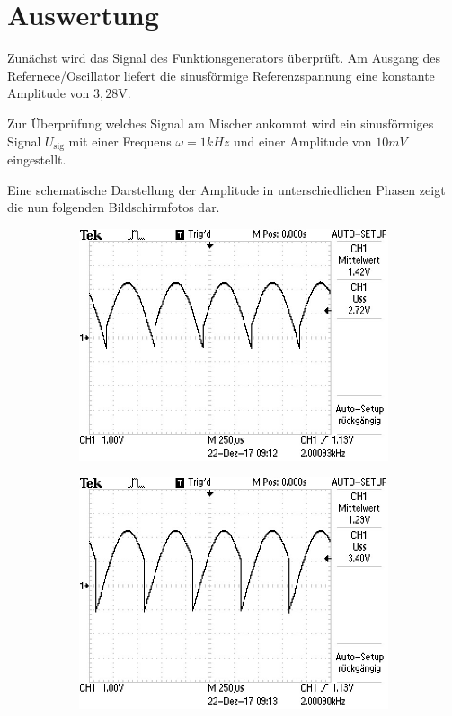 \section{Auswertung}
Zunächst wird das Signal des Funktionsgenerators überprüft. Am Ausgang des Refernece/Oscillator liefert
die sinusförmige Referenzspannung eine konstante Amplitude von $3,28 \si{\volt}$.

Zur Überprüfung welches Signal am Mischer ankommt wird ein sinusförmiges Signal $U_\text{sig}$ mit
einer Frequens $\omega = 1 kHz$ und einer Amplitude von $10 mV$ eingestellt.

Eine schematische Darstellung der Amplitude in unterschiedlichen Phasen zeigt die nun folgenden
Bildschirmfotos dar.
\begin{figure}[H]
\centering
\begin{subfigure}{0.48\textwidth}
	\includegraphics[width=\textwidth]{0Grad.JPG}
\end{subfigure}
\begin{subfigure}{0.48\textwidth}
  \includegraphics[width=\textwidth]{45Grad.JPG}

\end{subfigure}
\end{figure}
